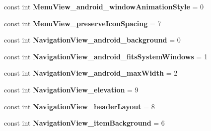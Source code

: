\begin{DoxyCompactItemize}
\item 
\hypertarget{classClient_1_1Droid_1_1Resource_1_1Styleable_acb80d9ac4384a19c2d821cbc70a02f13}{}const int {\bfseries Menu\+View\+\_\+android\+\_\+window\+Animation\+Style} = 0\label{classClient_1_1Droid_1_1Resource_1_1Styleable_acb80d9ac4384a19c2d821cbc70a02f13}

\item 
\hypertarget{classClient_1_1Droid_1_1Resource_1_1Styleable_aca0e0d5dfae16e0281333d263c48e420}{}const int {\bfseries Menu\+View\+\_\+preserve\+Icon\+Spacing} = 7\label{classClient_1_1Droid_1_1Resource_1_1Styleable_aca0e0d5dfae16e0281333d263c48e420}

\item 
\hypertarget{classClient_1_1Droid_1_1Resource_1_1Styleable_a7c288c5d297e9a26fe5684acf83721b8}{}const int {\bfseries Navigation\+View\+\_\+android\+\_\+background} = 0\label{classClient_1_1Droid_1_1Resource_1_1Styleable_a7c288c5d297e9a26fe5684acf83721b8}

\item 
\hypertarget{classClient_1_1Droid_1_1Resource_1_1Styleable_aa2e1060d199b0a0101e283985c3834f1}{}const int {\bfseries Navigation\+View\+\_\+android\+\_\+fits\+System\+Windows} = 1\label{classClient_1_1Droid_1_1Resource_1_1Styleable_aa2e1060d199b0a0101e283985c3834f1}

\item 
\hypertarget{classClient_1_1Droid_1_1Resource_1_1Styleable_af4a15d27616b92c0ebc9998614d2e188}{}const int {\bfseries Navigation\+View\+\_\+android\+\_\+max\+Width} = 2\label{classClient_1_1Droid_1_1Resource_1_1Styleable_af4a15d27616b92c0ebc9998614d2e188}

\item 
\hypertarget{classClient_1_1Droid_1_1Resource_1_1Styleable_ab86601eca91682c2a8648f35c8d30408}{}const int {\bfseries Navigation\+View\+\_\+elevation} = 9\label{classClient_1_1Droid_1_1Resource_1_1Styleable_ab86601eca91682c2a8648f35c8d30408}

\item 
\hypertarget{classClient_1_1Droid_1_1Resource_1_1Styleable_a287b720c05d984ea612679fdad523324}{}const int {\bfseries Navigation\+View\+\_\+header\+Layout} = 8\label{classClient_1_1Droid_1_1Resource_1_1Styleable_a287b720c05d984ea612679fdad523324}

\item 
\hypertarget{classClient_1_1Droid_1_1Resource_1_1Styleable_af3cf58b57b7115bc31f4114a95d4e01e}{}const int {\bfseries Navigation\+View\+\_\+item\+Background} = 6\label{classClient_1_1Droid_1_1Resource_1_1Styleable_af3cf58b57b7115bc31f4114a95d4e01e}


\end{DoxyCompactItemize}
